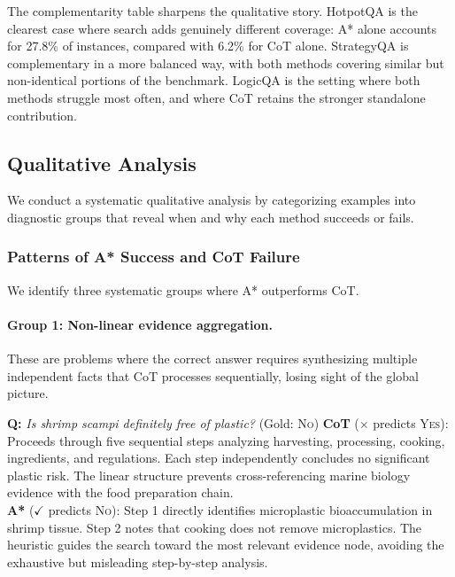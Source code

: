 \documentclass[11pt]{article}
\begin{document}
The complementarity table sharpens the qualitative story. HotpotQA is the clearest case where search adds genuinely different coverage: A* alone accounts for 27.8\% of instances, compared with 6.2\% for CoT alone. StrategyQA is complementary in a more balanced way, with both methods covering similar but non-identical portions of the benchmark. LogicQA is the setting where both methods struggle most often, and where CoT retains the stronger standalone contribution.

\subsection{Qualitative Analysis}
\label{sec:qualitative}

We conduct a systematic qualitative analysis by categorizing examples into diagnostic groups that reveal when and why each method succeeds or fails.

\subsubsection{Patterns of A* Success and CoT Failure}
\label{sec:astar_success}

We identify three systematic groups where A* outperforms CoT.

\paragraph{Group 1: Non-linear evidence aggregation.} These are problems where the correct answer requires synthesizing multiple independent facts that CoT processes sequentially, losing sight of the global picture.

\begin{examplebox}[title=StrategyQA --- Non-linear Evidence Aggregation]
\textbf{Q:} \emph{Is shrimp scampi definitely free of plastic?} \quad (Gold: \textsc{No})
\tcblower
\textbf{CoT} ($\times$ predicts \textsc{Yes}): Proceeds through five sequential steps analyzing harvesting, processing, cooking, ingredients, and regulations. Each step independently concludes no significant plastic risk. The linear structure prevents cross-referencing marine biology evidence with the food preparation chain.\\[4pt]
\textbf{A*} ($\checkmark$ predicts \textsc{No}): Step 1 directly identifies microplastic bioaccumulation in shrimp tissue. Step 2 notes that cooking does not remove microplastics. The heuristic guides the search toward the most relevant evidence node, avoiding the exhaustive but misleading step-by-step analysis.
\end{examplebox}
\end{document}
